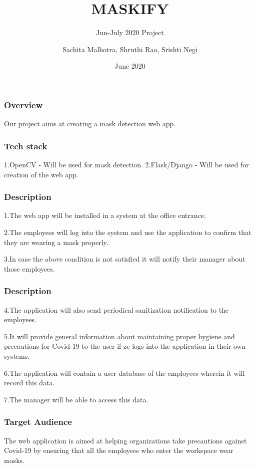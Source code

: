 \documentclass[14pt]{beamer}
\title{MASKIFY}
\subtitle{Jun-July 2020 Project}
\author[TEAM 6]{Sachita Malhotra, Shruthi Rao, Srishti Negi}
\date{June 2020}
\begin{document}
\begin{frame}
    \titlepage
\end{frame}

\begin{frame}
    \frametitle{Overview}
    Our project aims at creating a mask detection web app.
\end{frame}

\begin{frame}
    \frametitle{Tech stack}
    1.OpenCV - Will be used for mask detection.
    2.Flask/Django - Will be used for creation of the web app.
\end{frame} 

\begin{frame}
    \frametitle{Description}
    1.The web app will be installed in a system at the office entrance.

    2.The employees will log into the system and use the application to confirm that they are wearing a mask properly.

    3.In case the above condition is not satisfied it will notify their manager about those employees.
\end{frame}

\begin{frame}
    \frametitle{Description}
    4.The application will also send periodical sanitization notification to the employees.
    
    5.It will provide general information about maintaining proper hygiene and precautions for Covid-19 to the user if ze logs into the application in their own systems.
    
    6.The application will contain a user database of the employees wherein it will record this data.
    
    7.The manager will be able to access this data.
\end{frame}

\begin{frame}
    \frametitle{Target Audience}
    The web application is  aimed at helping organizations take precautions against Covid-19 by ensuring that all the employees who enter the workspace wear masks.
\end{frame}
\end{document}

